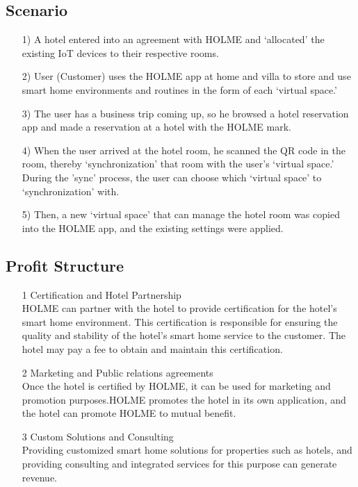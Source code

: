 \documentclass[conference]{IEEEtran}
\begin{document}
\subsection{Scenario}
\begin{itemize}
\item [1)] A hotel entered into an agreement with HOLME and `allocated’ the existing IoT devices to their respective rooms.
\\
\item [2)] User (Customer) uses the HOLME app at home and villa to store and use smart home environments and routines in the form of each `virtual space.’
\\
\item [3)] The user has a business trip coming up, so he browsed a hotel reservation app and made a reservation at a hotel with the HOLME mark.
\\
\item [4)] When the user arrived at the hotel room, he scanned the QR code in the room, thereby `synchronization' that room with the user's `virtual space.’ During the 'sync' process, the user can choose which `virtual space' to `synchronization' with.
\\
\item [5)]Then, a new `virtual space’ that can manage the hotel room was copied into the HOLME app, and the existing settings were applied.
\\
\end{itemize}



\subsection{Profit Structure}
\begin{itemize}
\item [1] Certification and Hotel Partnership\\
HOLME can partner with the hotel to provide certification for the hotel's smart home environment. This certification is responsible for ensuring the quality and stability of the hotel's smart home service to the customer. The hotel may pay a fee to obtain and maintain this certification.
\\
\item [2] Marketing and Public relations agreements\\
Once the hotel is certified by HOLME, it can be used for marketing and promotion purposes.HOLME promotes the hotel in its own application, and the hotel can promote HOLME to mutual benefit.
\\
\item [3] Custom Solutions and Consulting\\
Providing customized smart home solutions for properties such as hotels, and providing consulting and integrated services for this purpose can generate revenue.
\\
\end{itemize}
\end{document}
